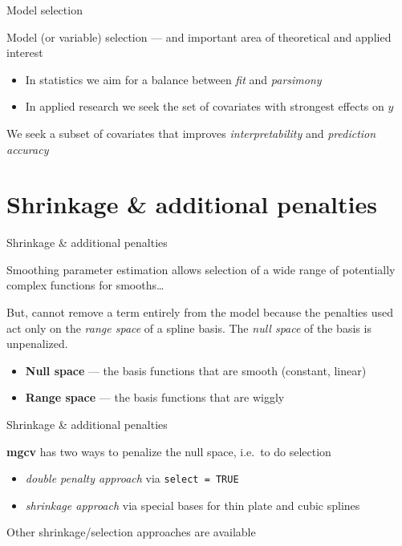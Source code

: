 \documentclass[10pt,ignorenonframetext,compress, aspectratio=169]{beamer}
\providecommand{\tightlist}{%
  \setlength{\itemsep}{0pt}\setlength{\parskip}{0pt}}
\begin{document}
\begin{frame}{Model selection}

Model (or variable) selection --- and important area of theoretical and
applied interest

\begin{itemize}
\tightlist
\item
  In statistics we aim for a balance between \emph{fit} and
  \emph{parsimony}
\item
  In applied research we seek the set of covariates with strongest
  effects on \(y\)
\end{itemize}

We seek a subset of covariates that improves \emph{interpretability} and
\emph{prediction accuracy}

\end{frame}

\section{Shrinkage \& additional
penalties}\label{shrinkage-additional-penalties}

\begin{frame}{Shrinkage \& additional penalties}

Smoothing parameter estimation allows selection of a wide range of
potentially complex functions for smooths\ldots{}

But, cannot remove a term entirely from the model because the penalties
used act only on the \emph{range space} of a spline basis. The
\emph{null space} of the basis is unpenalized.

\begin{itemize}
\tightlist
\item
  \textbf{Null space} --- the basis functions that are smooth (constant,
  linear)
\item
  \textbf{Range space} --- the basis functions that are wiggly
\end{itemize}

\end{frame}

\begin{frame}[fragile]{Shrinkage \& additional penalties}

\textbf{mgcv} has two ways to penalize the null space, i.e.~to do
selection

\begin{itemize}
\tightlist
\item
  \emph{double penalty approach} via \texttt{select\ =\ TRUE}
\item
  \emph{shrinkage approach} via special bases for thin plate and cubic
  splines
\end{itemize}

Other shrinkage/selection approaches are available

\end{frame}
\end{document}
